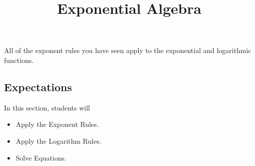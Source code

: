\documentclass{ximera}
\title{Exponential Algebra}
\begin{document}
\begin{abstract}
\end{abstract}
\maketitle



All of the exponent rules you have seen apply to the exponential and logarithmic functions.













\subsection{Expectations}


\begin{sectionOutcomes}
In this section, students will 

\begin{itemize}
\item Apply the Exponent Rules.
\item Apply the Logarithm Rules.
\item Solve Equations.
\end{itemize}
\end{sectionOutcomes}
\end{document}
